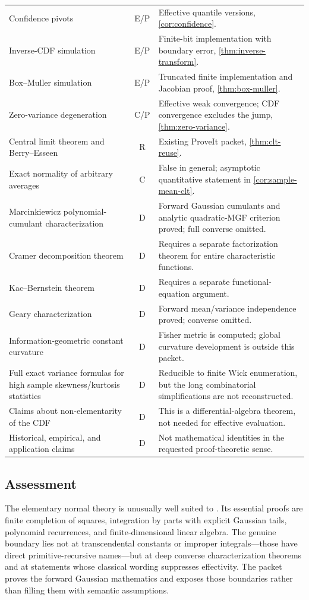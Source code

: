 \begin{longtable}{@{}>{\raggedright\arraybackslash}p{} c >{\raggedright\arraybackslash}p{}@{}}
Confidence pivots & E/P & Effective quantile versions, \cref{cor:confidence}.\\
Inverse-CDF simulation & E/P & Finite-bit implementation with boundary error, \cref{thm:inverse-transform}.\\
Box--Muller simulation & E/P & Truncated finite implementation and Jacobian proof, \cref{thm:box-muller}.\\
Zero-variance degeneration & C/P & Effective weak convergence; CDF convergence excludes the jump, \cref{thm:zero-variance}.\\
Central limit theorem and Berry--Esseen & R & Existing ProveIt packet, \cref{thm:clt-reuse}.\\
Exact normality of arbitrary averages & C & False in general; asymptotic quantitative statement in \cref{cor:sample-mean-clt}.\\
Marcinkiewicz polynomial-cumulant characterization & D & Forward Gaussian cumulants and analytic quadratic-MGF criterion proved; full converse omitted.\\
Cramer decomposition theorem & D & Requires a separate factorization theorem for entire characteristic functions.\\
Kac--Bernstein theorem & D & Requires a separate functional-equation argument.\\
Geary characterization & D & Forward mean/variance independence proved; converse omitted.\\
Information-geometric constant curvature & D & Fisher metric is computed; global curvature development is outside this packet.\\
Full exact variance formulas for high sample skewness/kurtosis statistics & D & Reducible to finite Wick enumeration, but the long combinatorial simplifications are not reconstructed.\\
Claims about non-elementarity of the CDF & D & This is a differential-algebra theorem, not needed for effective evaluation.\\
Historical, empirical, and application claims & D & Not mathematical identities in the requested proof-theoretic sense.\\
\bottomrule
\end{longtable}
\normalsize

\subsection{Assessment}

The elementary normal theory is unusually well suited to \ipra.  Its essential proofs are finite completion of squares, integration by parts with explicit Gaussian tails, polynomial recurrences, and finite-dimensional linear algebra.  The genuine boundary lies not at transcendental constants or improper integrals---those have direct primitive-recursive names---but at deep converse characterization theorems and at statements whose classical wording suppresses effectivity.  The packet proves the forward Gaussian mathematics and exposes those boundaries rather than filling them with semantic assumptions.
